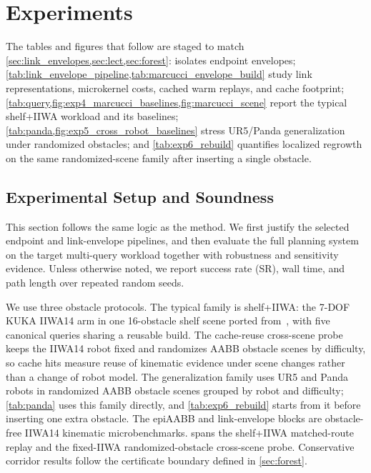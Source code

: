 \documentclass[journal]{IEEEtran}
\begin{document}
\section{Experiments}\label{sec:exp}

The tables and figures that follow are staged to match \cref{sec:link_envelopes,sec:lect,sec:forest}:
 isolates endpoint envelopes; \cref{tab:link_envelope_pipeline,tab:marcucci_envelope_build} study link representations, microkernel costs, cached warm replays, and cache footprint; \cref{tab:query,fig:exp4_marcucci_baselines,fig:marcucci_scene} report the typical shelf+IIWA workload and its baselines; \cref{tab:panda,fig:exp5_cross_robot_baselines} stress UR5/Panda generalization under randomized obstacles; and \cref{tab:exp6_rebuild} quantifies localized regrowth on the same randomized-scene family after inserting a single obstacle.

\subsection{Experimental Setup and Soundness}\label{sec:exp_setup_sound}

This section follows the same logic as the method. We first justify
the selected endpoint and link-envelope pipelines, and then evaluate the full
planning system on the target multi-query workload together with robustness and
sensitivity evidence. Unless otherwise noted, we report success rate (SR), wall
time, and path length over repeated random seeds.

We use three obstacle protocols. The typical family is shelf+IIWA: the 7-DOF
KUKA IIWA14 arm in one 16-obstacle shelf scene ported
from~\cite{marcucci2023motion}, with five canonical queries sharing a reusable
build. The cache-reuse cross-scene probe keeps the IIWA14 robot fixed and
randomizes AABB obstacle scenes by difficulty, so cache hits measure reuse of
kinematic evidence under scene changes rather than a change of robot model. The
generalization family uses UR5 and Panda robots in randomized AABB obstacle
scenes grouped by robot and difficulty; \cref{tab:panda} uses this family
directly, and \cref{tab:exp6_rebuild} starts from it before inserting one extra
obstacle. The epiAABB and link-envelope blocks are obstacle-free IIWA14
kinematic microbenchmarks.  spans the
shelf+IIWA matched-route replay and the fixed-IIWA randomized-obstacle
cross-scene probe. Conservative corridor results follow the certificate boundary
defined in \cref{sec:forest}.
\end{document}
